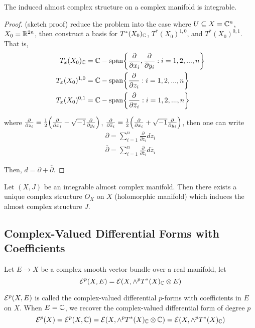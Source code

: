 \begin{theorem}
	The induced almost complex structure on a complex manifold is integrable.
	\begin{proof}
		(sketch proof)
		reduce the problem into the case where $U \subseteq X = \mathbb{C}^n$, $X_0 = \mathbb{R}^{2n}$, then construct a basis for $T^*(X_0)_{\mathbb{C}}$, $T^*(X_0)^{1,0}$, and $T^*(X_0)^{0,1}$. That is,
		\begin{align*}
			T_x(X_0)_\C &= \C - \Span \set*{\frac{\partial}{\partial x_i}, \frac{\partial}{\partial y_i}: i = 1, 2, ..., n} \\
			T_x(X_0)^{1,0} &= \C - \Span \set*{\frac{\partial}{\partial z_i}: i = 1, 2, ..., n} \\
			T_x(X_0)^{0,1} &= \C - \Span \set*{\frac{\partial}{\partial \overline{z}_i}: i = 1, 2, ..., n}
		\end{align*}
		
		where $\frac{\partial}{\partial z_i} = \frac{1}{2}\tuple*{\frac{\partial}{\partial x_i}  -\sqrt{-1} \frac{\partial}{\partial y_i}}$, $\frac{\partial}{\partial \overline{z}_i} = \frac{1}{2}\tuple*{\frac{\partial}{\partial x_i}  + \sqrt{-1} \frac{\partial}{\partial y_i}}$, then one can write
		\begin{align*}
			\partial = \sum_{i=1}^n \frac{\partial}{\partial z_i} dz_i \\
			\overline{\partial} = \sum_{i=1}^n \frac{\partial}{\partial \overline{z}_i} d\overline{z}_i
		\end{align*}
		
		Then, $d = \partial + \overline{\partial}$. 
	\end{proof}
\end{theorem}

\begin{theorem}
	Let $(X,J)$ be an integrable almost complex manifold. Then there exists a unique complex structure $O_X$ on $X$ (holomorphic manifold) which induces the almost complex structure $J$.
\end{theorem}

\subsection{Complex-Valued Differential Forms with Coefficients}

\begin{definition}
	Let $E \to X$ be a complex smooth vector bundle over a real manifold, let
	$$
	\E^p(X, E) = \E \tuple*{X, \wedge^p T^*(X)_\C \otimes E}
	$$
	
	$\mathcal{E}^p(X, E)$ is called the complex-valued differential $p$-forms with coefficients in $E$ on $X$. When $E = \mathbb{C}$, we recover the complex-valued differential form of degree $p$
	$$
	\E^p(X) = \E^p(X, \C) = \E \tuple*{X, \wedge^p T^*(X)_\C \otimes \C} = \E \tuple*{X, \wedge^p T^*(X)_\C}
	$$
\end{definition}


